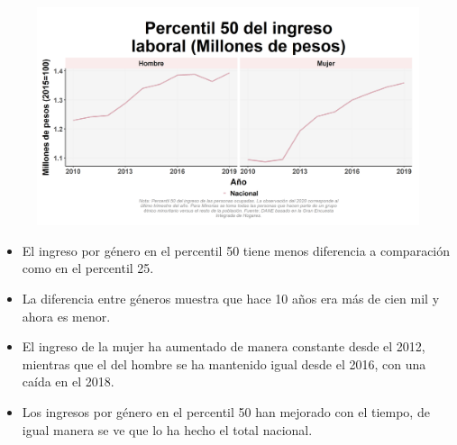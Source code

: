     \begin{figure}[H]
        \caption[Percentil 50 del ingreso laboral por género]{ \label{ingreso_laboral_50_genero} }
        \begin{center}
        \includegraphics[width=\textwidth,keepaspectratio]{img/var_16_trend.png}
        \end{center}
    \end{figure}
            \begin{itemize}
                    \item El ingreso por género en el percentil 50 tiene menos diferencia a comparación como en el percentil 25.
                    \item La diferencia entre géneros muestra que hace 10 años era más de cien mil y ahora es menor.
                    \item El ingreso de la mujer ha aumentado de manera constante desde el 2012, mientras que el del hombre se ha mantenido igual desde el 2016, con una caída en el 2018.
                    \item Los ingresos por género en el percentil 50 han mejorado con el tiempo, de igual manera se ve que lo ha hecho el total nacional.
                \end{itemize}

